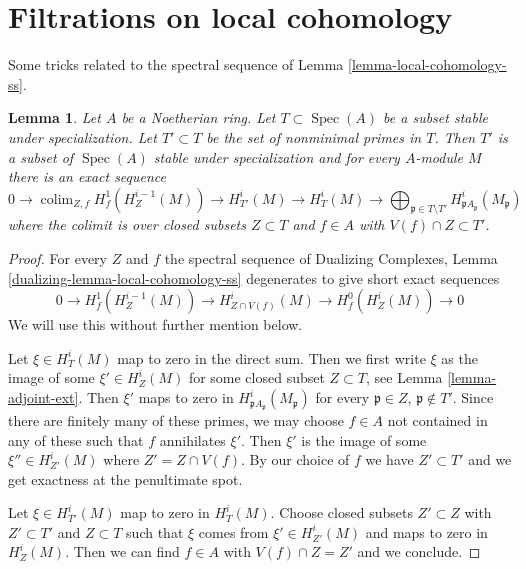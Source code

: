\documentclass{stacks-project}
\theoremstyle{plain}
\newtheorem{lemma}[subsection]{Lemma}
\theoremstyle{definition}
\theoremstyle{remark}
\numberwithin{equation}{subsection}
\def\colim{\mathop{\mathrm{colim}}\nolimits}
\def\Spec{\mathop{\mathrm{Spec}}}
\begin{document}
\section{Filtrations on local cohomology}
\label{section-filter-local-cohomology}

\noindent
Some tricks related to the spectral sequence of
Lemma \ref{lemma-local-cohomology-ss}.

\begin{lemma}
\label{lemma-filter-local-cohomology}
Let $A$ be a Noetherian ring. Let $T \subset \Spec(A)$
be a subset stable under specialization. Let $T' \subset T$ be
the set of nonminimal primes in $T$. Then $T'$
is a subset of $\Spec(A)$ stable under specialization
and for every $A$-module $M$ there is an exact sequence
$$
0 \to
\colim_{Z, f} H^1_f(H^{i - 1}_Z(M)) \to
H^i_{T'}(M) \to H^i_T(M) \to
\bigoplus\nolimits_{\mathfrak p \in T \setminus T'}
H^i_{\mathfrak p A_\mathfrak p}(M_\mathfrak p)
$$
where the colimit is over closed subsets $Z \subset T$
and $f \in A$ with $V(f) \cap Z \subset T'$.
\end{lemma}

\begin{proof}
For every $Z$ and $f$ the spectral sequence of
Dualizing Complexes, Lemma \ref{dualizing-lemma-local-cohomology-ss}
degenerates to give short exact sequences
$$
0 \to H^1_f(H^{i - 1}_Z(M)) \to
H^i_{Z \cap V(f)}(M) \to H^0_f(H^i_Z(M)) \to 0
$$
We will use this without further mention below.

\medskip\noindent
Let $\xi \in H^i_T(M)$ map to zero in the direct sum.
Then we first write $\xi$ as the image of some $\xi' \in H^i_Z(M)$
for some closed subset $Z \subset T$, see Lemma \ref{lemma-adjoint-ext}.
Then $\xi'$ maps to zero in $H^i_{\mathfrak p A_\mathfrak p}(M_\mathfrak p)$
for every $\mathfrak p \in Z$, $\mathfrak p \not \in T'$.
Since there are finitely many of these primes,
we may choose $f \in A$ not contained in any of these
such that $f$ annihilates $\xi'$. Then $\xi'$
is the image of some $\xi'' \in H^i_{Z'}(M)$
where $Z' = Z \cap V(f)$. By our choice of $f$ we have
$Z' \subset T'$ and we get exactness at the penultimate spot.

\medskip\noindent
Let $\xi \in H^i_{T'}(M)$ map to zero in $H^i_T(M)$.
Choose closed subsets $Z' \subset Z$ with $Z' \subset T'$
and $Z \subset T$ such that $\xi$ comes from $\xi' \in H^i_{Z'}(M)$
and maps to zero in $H^i_Z(M)$. Then we can find $f \in A$
with $V(f) \cap Z = Z'$ and we conclude.
\end{proof}
\end{document}
